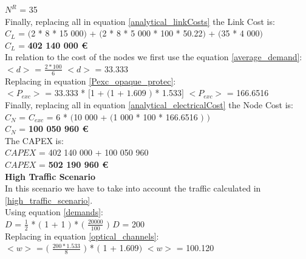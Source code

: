 $N^R$ = 35\\

Finally, replacing all in equation \ref{analytical_linkCosts} the Link Cost is:\\

$C_L$ = $($2 * 8 * 15 000$)$ + $($2 * 8 * 5 000 * 100 * 50.22$)$ + $($35 * 4 000$)$\\

$C_L$ = \textbf{402 140 000 \euro}\\

In relation to the cost of the nodes we first use the equation \ref{average_demand}:\\

$<d>$ = $\frac{2 * 100}{6}$ \qquad \qquad $<d>$ = 33.333\\

Replacing in equation \ref{Pexc_opaque_protec}:\\

$<P_{exc}>$ = 33.333 * $[$1 + $($1 + $1.609$ $)$ * 1.533$]$ \qquad \quad $<P_{exc}>$ = 166.6516 \\

Finally, replacing all in equation \ref{analytical_electricalCost} the Node Cost is:\\

$C_N$ = $C_{exc}$ = 6 * $($10 000 + $($1 000 * 100 * 166.6516 $)$ $)$\\

$C_N$ = \textbf{100 050 960 \euro}\\

The CAPEX is:\\
$CAPEX$ = 402 140 000 + 100 050 960\\

$CAPEX$ = \textbf{502 190 960 \euro}\\

\textbf{High Traffic Scenario}\\
In this scenario we have to take into account the traffic calculated in \ref{high_traffic_scenario}.\\

Using equation \ref{demands}:\\

$D$ = $\frac{1}{2}$ * $($ 1 + 1 $)$ * $($ $\frac{20000}{100}$ $)$ \qquad \qquad $D$ = 200\\

Replacing in equation \ref{optical_channels}:\\

$<w>$ = $($ $\frac{200 * 1.533}{8}$ $)$ * $($ 1 + 1.609$)$ \qquad \qquad $<w>$ = 100.120\\


